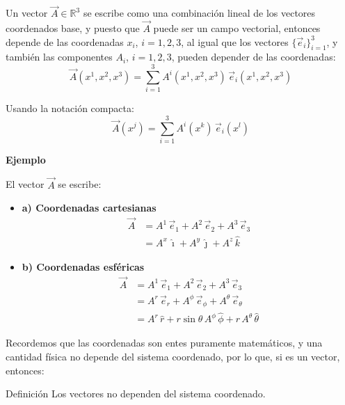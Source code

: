 \documentclass[../apunte_mecanica_clasica.tex]{subfiles}%
\begin{document}
Un vector $\vec{A} \in \mathbb{R}^3$ se escribe como una combinación lineal de los vectores coordenados base, y puesto que $\vec{A}$ puede ser un campo vectorial, entonces depende de las coordenadas $x_i$, $i = 1,2,3$, al igual que los vectores $\{\vec{e}_i\}_{i=1}^{3}$, y también las componentes $A_i$, $i = 1,2,3$, pueden depender de las coordenadas:
\begin{equation*}
\vec{A}(x^1, x^2, x^3) = \sum_{i=1}^{3} A^i(x^1, x^2, x^3)\, \vec{e}_i(x^1, x^2, x^3)
\end{equation*}

Usando la notación compacta:
\begin{equation*}
\vec{A}(x^j) = \sum_{i=1}^{3} A^i(x^k)\, \vec{e}_i(x^l)
\end{equation*}

\textbf{Ejemplo}

El vector $\vec{A}$ se escribe:

\begin{itemize}
    \item\textbf{a) Coordenadas cartesianas}
\begin{equation*}
\begin{aligned}
\vec{A} &= A^1 \, \vec{e}_1 + A^2 \, \vec{e}_2 + A^3 \, \vec{e}_3 \\
&= A^x \, \hat{\imath} + A^y \, \hat{\jmath} + A^z \, \hat{k}    
\end{aligned}
\end{equation*}

    \item \textbf{b) Coordenadas esféricas}
\begin{equation*}
\begin{aligned}
\vec{A} &= A^1 \, \vec{e}_1 + A^2 \, \vec{e}_2 + A^3 \, \vec{e}_3 \\
&= A^r \, \vec{e}_r + A^\phi \, \vec{e}_\phi + A^\theta \, \vec{e}_\theta \\
&= A^r \, \hat{r} + r \sin\theta \, A^\phi \, \hat{\phi} + r \, A^\theta \, \hat{\theta}    
\end{aligned}
\end{equation*}
\end{itemize}

Recordemos que las coordenadas son entes puramente matemáticos, y una cantidad física no depende del sistema coordenado, por lo que, si es un vector, entonces:

\begin{apuntebloque}{Definición}
Los vectores no dependen del sistema coordenado.
\end{apuntebloque}
\end{document}
